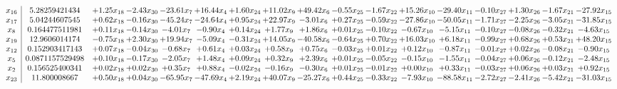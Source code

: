 \documentclass[9pt]{article}
\begin{document}
 \[\begin{array}{c| c c@{\hskip 2pt} c@{\hskip 2pt} c@{\hskip 2pt} c@{\hskip 2pt} c@{\hskip 2pt} c@{\hskip 2pt} c@{\hskip 2pt} c@{\hskip 2pt} c@{\hskip 2pt} c@{\hskip 2pt} c@{\hskip 2pt} c@{\hskip 2pt} c@{\hskip 2pt} c@{\hskip 2pt} c@{\hskip 2pt} }
 x_{16}   &  5.28259421434 & +  1.25 x_{18} & -2.43 x_{30} & -23.61 x_{7} & + 16.44 x_{4} & +  1.60 x_{24} & + 11.02 x_{9} & + 49.42 x_{6} & -0.55 x_{25} & -1.67 x_{22} & + 15.26 x_{10} & -29.40 x_{11} & -0.10 x_{27} & +  1.30 x_{26} & -1.67 x_{21} & -27.92 x_{15}\\
 x_{17}   &  5.04244607545 & +  0.62 x_{18} & -0.16 x_{30} & -45.24 x_{7} & -24.64 x_{4} & +  0.95 x_{24} & + 22.97 x_{9} & -3.01 x_{6} & +  0.27 x_{25} & -0.59 x_{22} & -27.86 x_{10} & -50.05 x_{11} & -1.71 x_{27} & -2.25 x_{26} & -3.05 x_{21} & -31.85 x_{15}\\
 x_{8}   &  0.164477511981 & +  0.11 x_{18} & -0.14 x_{30} & -4.01 x_{7} & -0.90 x_{4} & +  0.14 x_{24} & +  1.77 x_{9} & +  1.86 x_{6} & +  0.01 x_{25} & -0.10 x_{22} & -0.67 x_{10} & -5.15 x_{11} & -0.10 x_{27} & -0.08 x_{26} & -0.32 x_{21} & -4.63 x_{15}\\
 x_{19}   &  12.9606014174 & -0.75 x_{18} & +  2.30 x_{30} & + 19.94 x_{7} & -5.09 x_{4} & -0.31 x_{24} & + 14.05 x_{9} & -40.58 x_{6} & -0.64 x_{25} & +  0.70 x_{22} & + 16.03 x_{10} & +  6.18 x_{11} & -0.99 x_{27} & +  0.68 x_{26} & +  0.53 x_{21} & + 48.20 x_{15}\\
 x_{12}   &  0.152903417143 & +  0.07 x_{18} & -0.04 x_{30} & -0.68 x_{7} & +  0.61 x_{4} & +  0.03 x_{24} & +  0.58 x_{9} & +  0.75 x_{6} & -0.03 x_{25} & +  0.01 x_{22} & +  0.12 x_{10} & -0.87 x_{11} & -0.01 x_{27} & +  0.02 x_{26} & -0.08 x_{21} & -0.90 x_{15}\\
 x_{5}   &  0.0871157529498 & +  0.10 x_{18} & -0.17 x_{30} & -2.05 x_{7} & +  1.48 x_{4} & +  0.09 x_{24} & +  0.32 x_{9} & +  2.39 x_{6} & +  0.01 x_{25} & -0.05 x_{22} & -0.15 x_{10} & -1.55 x_{11} & -0.04 x_{27} & +  0.06 x_{26} & -0.12 x_{21} & -2.48 x_{15}\\
 x_{2}   &  0.156525400341 & +  0.02 x_{18} & +  0.02 x_{30} & +  0.35 x_{7} & +  0.88 x_{4} & -0.02 x_{24} & -0.16 x_{9} & -0.30 x_{6} & +  0.01 x_{25} & -0.01 x_{22} & +  0.00 x_{10} & +  0.33 x_{11} & -0.03 x_{27} & +  0.06 x_{26} & +  0.03 x_{21} & +  0.92 x_{15}\\
 x_{23}   &  11.800008667 & +  0.50 x_{18} & +  0.04 x_{30} & -65.95 x_{7} & -47.69 x_{4} & +  2.19 x_{24} & + 40.07 x_{9} & -25.27 x_{6} & +  0.44 x_{25} & -0.33 x_{22} & -7.93 x_{10} & -88.58 x_{11} & -2.72 x_{27} & -2.41 x_{26} & -5.42 x_{21} & -31.03 x_{15}\\

\end{array}\]
\end{document}
